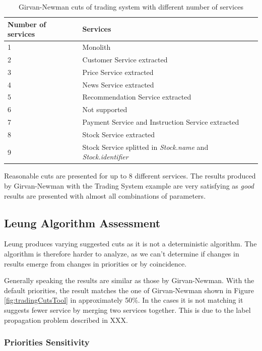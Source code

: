 \begin{table}[H]
	\centering
	\caption{Girvan-Newman cuts of trading system with different number of services}
	\label{tab:tradingNumberOfServices}
	\begin{tabular}{|p{60pt}|p{200pt}|}
		\hline	
		\textbf{Number of services} & \textbf{Services}  \\
		\hline
		1 & Monolith \\
		\hline
		2 & Customer Service extracted \\
		\hline
		3 & Price Service extracted  \\
		\hline
		4 & News Service extracted  \\
		\hline
		5 & Recommendation Service extracted  \\
		\hline
		6 & Not supported\\
		\hline
		7 & Payment Service and Instruction Service extracted \\
		\hline
		8 & Stock Service extracted \\
		\hline
		9 & Stock Service splitted in \textit{Stock.name} and \textit{Stock.identifier} \\
		\hline
	\end{tabular}
\end{table}

Reasonable cuts are presented for up to 8 different services. The results produced by Girvan-Newman with the Trading System example are very satisfying as \textit{good} results are presented with almost all combinations of parameters. 

\subsection{Leung Algorithm Assessment}

Leung produces varying suggested cuts as it is not a deterministic algorithm. The algorithm is therefore harder to analyze, as we can't determine if changes in results emerge from changes in priorities or by coincidence. 

Generally speaking the results are similar as those by Girvan-Newman. With the default priorities, the result matches the one of Girvan-Newman shown in Figure \ref{fig:tradingCutsTool} in approximately 50\%. In the cases it is not matching it suggests fewer service by merging two services together. This is due to the label propagation problem described in XXX.

\subsubsection{Priorities Sensitivity}

